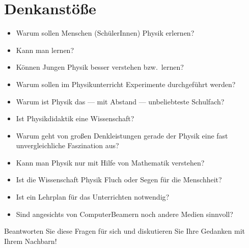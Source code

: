 \chapter{Denkanstöße}\label{Denk}

\begin{itemize}
\item
Warum sollen Menschen (Sch\"{u}lerInnen) Physik erlernen?
\item
Kann man  lernen?
\item
K\"{o}nnen Jungen Physik besser verstehen bzw.\ lernen?
\item
Warum sollen im Physikunterricht Experimente durchgef\"{u}hrt werden?
\item
Warum ist Physik das --- mit Abstand --- unbeliebteste Schulfach?
\item
Ist Physikdidaktik eine Wissenschaft?
\item
Warum geht von gro{\ss}en Denkleistungen gerade der Physik eine fast unvergleichliche Faszination aus?
\item
Kann man Physik nur mit Hilfe von Mathematik verstehen?
\item
Ist die Wissenschaft Physik Fluch oder Segen f\"{u}r die Menschheit?
\item
Ist ein Lehrplan f\"{u}r das Unterrichten notwendig?
\item
Sind angesichts von ComputerBeamern noch andere Medien sinnvoll?
\end{itemize}

\begin{uea}
	Beantworten Sie diese Fragen für sich und diskutieren Sie Ihre Gedanken mit Ihrem Nachbarn!
\end{uea}